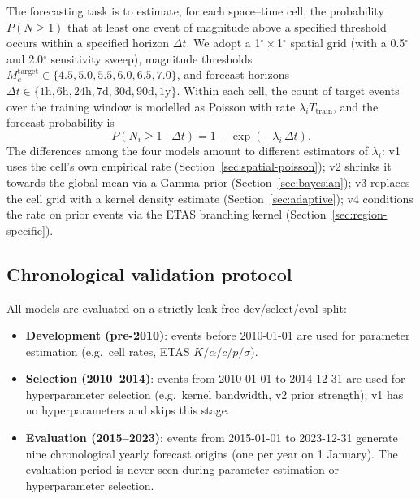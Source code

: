 \documentclass[10pt,a4paper,twocolumn]{article}
\begin{document}
The forecasting task is to estimate, for each space--time cell, the probability $P(N\geq1)$ that at least one event of magnitude above a specified threshold occurs within a specified horizon $\Delta t$. We adopt a 1$^\circ\times$1$^\circ$ spatial grid (with a 0.5$^\circ$ and 2.0$^\circ$ sensitivity sweep), magnitude thresholds $M_c^{\text{target}}\in\{4.5, 5.0, 5.5, 6.0, 6.5, 7.0\}$, and forecast horizons $\Delta t\in\{1\text{h}, 6\text{h}, 24\text{h}, 7\text{d}, 30\text{d}, 90\text{d}, 1\text{y}\}$. Within each cell, the count of target events over the training window is modelled as Poisson with rate $\lambda_i T_{\text{train}}$, and the forecast probability is
\begin{equation}\label{eq:poisson-prob-generic}
P(N_i \geq 1 \mid \Delta t) = 1 - \exp\!\left(-\lambda_i \, \Delta t\right).
\end{equation}
The differences among the four models amount to different estimators of $\lambda_i$: v1 uses the cell's own empirical rate (Section~\ref{sec:spatial-poisson}); v2 shrinks it towards the global mean via a Gamma prior (Section~\ref{sec:bayesian}); v3 replaces the cell grid with a kernel density estimate (Section~\ref{sec:adaptive}); v4 conditions the rate on prior events via the ETAS branching kernel (Section~\ref{sec:region-specific}).

\subsection{Chronological validation protocol}

All models are evaluated on a strictly leak-free dev/select/eval split:

\begin{itemize}[leftmargin=1.2em,itemsep=2pt,topsep=2pt]
\item \textbf{Development (pre-2010)}: events before 2010-01-01 are used for parameter estimation (e.g.\ cell rates, ETAS $K/\alpha/c/p/\sigma$).
\item \textbf{Selection (2010--2014)}: events from 2010-01-01 to 2014-12-31 are used for hyperparameter selection (e.g.\ kernel bandwidth, v2 prior strength); v1 has no hyperparameters and skips this stage.
\item \textbf{Evaluation (2015--2023)}: events from 2015-01-01 to 2023-12-31 generate nine chronological yearly forecast origins (one per year on 1 January). The evaluation period is never seen during parameter estimation or hyperparameter selection.
\end{itemize}
\end{document}
